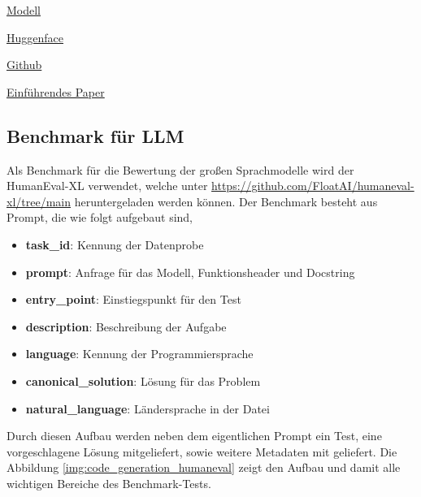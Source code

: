 \href{https://paperswithcode.com/sota/code-generation-on-humaneval}{Modell}

\href{https://huggingface.co/datasets/openai/openai_humaneval}{Huggenface}

\href{https://github.com/openai/human-eval/tree/master}{Github}

\href{https://arxiv.org/abs/2107.03374}{Einführendes Paper}



\subsection{Benchmark für LLM}
Als Benchmark für die Bewertung der großen Sprachmodelle wird der HumanEval-XL verwendet, welche unter \href{https://github.com/FloatAI/humaneval-xl/tree/main}{https://github.com/FloatAI/humaneval-xl/tree/main} heruntergeladen werden können. Der Benchmark besteht aus Prompt, die wie folgt aufgebaut sind,

\begin{itemize}
	\item \textbf{task\_id}: Kennung der Datenprobe
	\item \textbf{prompt}: Anfrage für das Modell, Funktionsheader und Docstring
	\item \textbf{entry\_point}: Einstiegspunkt für den Test
	\item \textbf{description}: Beschreibung der Aufgabe
	\item \textbf{language}: Kennung der Programmiersprache
	\item \textbf{canonical\_solution}: Lösung für das Problem
	\item \textbf{natural\_language}: Ländersprache in der Datei
\end{itemize}

Durch diesen Aufbau werden neben dem eigentlichen Prompt ein Test, eine vorgeschlagene Lösung mitgeliefert, sowie weitere Metadaten mit geliefert. Die Abbildung \ref{img:code_generation_humaneval} zeigt den Aufbau und damit alle wichtigen Bereiche des Benchmark-Tests.

